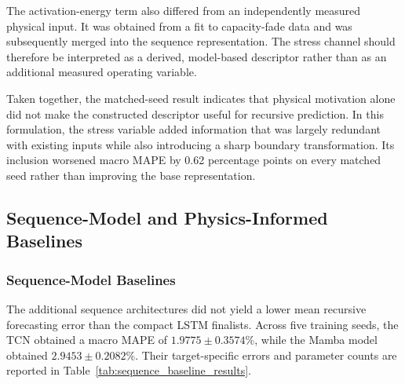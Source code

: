 \documentclass[a4paper,fleqn]{cas-sc}
\begin{document}
The activation-energy term also differed from an independently measured physical input. It was obtained from a fit to capacity-fade data and was subsequently merged into the sequence representation. The stress channel should therefore be interpreted as a derived, model-based descriptor rather than as an additional measured operating variable.

Taken together, the matched-seed result indicates that physical motivation alone did not make the constructed descriptor useful for recursive prediction. In this formulation, the stress variable added information that was largely redundant with existing inputs while also introducing a sharp boundary transformation. Its inclusion worsened macro MAPE by 0.62 percentage points on every matched seed rather than improving the base representation.


\subsection{Sequence-Model and Physics-Informed Baselines}
\label{sec:baseline_results}


\subsubsection{Sequence-Model Baselines}
\label{sec:sequence_baseline_results}

The additional sequence architectures did not yield a lower mean recursive forecasting error than the compact LSTM finalists. Across five training seeds, the TCN obtained a macro MAPE of $1.9775\pm0.3574$\%, while the Mamba model obtained $2.9453\pm0.2082$\%. Their target-specific errors and parameter counts are reported in Table~\ref{tab:sequence_baseline_results}.
\end{document}
